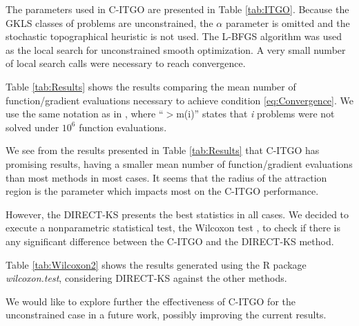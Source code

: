 The parameters used in C-ITGO are presented in Table \ref{tab:ITGO}. Because the GKLS classes of problems are unconstrained, the $\alpha$ parameter is omitted and the stochastic topographical heuristic is not used. The L-BFGS algorithm was used as the local search for unconstrained smooth optimization. A very small number of local search calls were necessary to reach convergence.



Table \ref{tab:Results} shows the results comparing the mean number of function/gradient evaluations necessary to achieve condition \ref{eq:Convergence}. We use the same notation as in \cite{NAT}, where “$>$m(i)” states that \textit{i} problems were not solved under $10^6$ function evaluations.




We see from the results presented in Table \ref{tab:Results} that C-ITGO has promising results, having a smaller mean number of function/gradient evaluations than most methods in most cases. It seems that the radius of the attraction region is the parameter which impacts most on the C-ITGO performance.

However, the DIRECT-KS presents the best statistics in all cases. We decided to execute a nonparametric statistical test, the Wilcoxon test \citep{Friedman}, to check if there is any significant difference between the C-ITGO and the DIRECT-KS method.

Table \ref{tab:Wilcoxon2} shows the results generated using the R package \textit{wilcoxon.test}, considering DIRECT-KS against the other methods. 

We would like to explore further the effectiveness of C-ITGO for the unconstrained case in a future work, possibly improving the current results.


